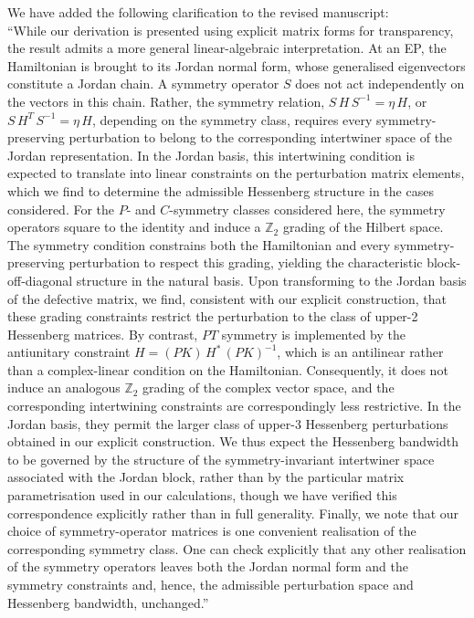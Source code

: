\documentclass[aps,prb,onecolumn,nofootinbib,citeautoscript,10pt]{revtex4-2}
\begin{document}
\begin{enumerate}
We have added the following clarification to the revised manuscript:
\\``While our derivation is presented using explicit matrix forms for transparency, the result admits a more general linear-algebraic interpretation. At an EP, the Hamiltonian is brought to its Jordan normal form, whose generalised eigenvectors constitute a Jordan chain. A symmetry operator $S$ does not act independently on the vectors in this chain. Rather, the symmetry relation, $S \,H\, S^{-1}=\eta \,H$, or $S\, H^{T}\, S^{-1}=\eta \,H$, depending on the symmetry class, requires every symmetry-preserving perturbation to belong to the corresponding intertwiner space of the Jordan representation. In the Jordan basis, this intertwining condition is expected to translate into linear constraints on the perturbation matrix elements, which we find to determine the admissible Hessenberg structure in the cases considered. For the $P$- and $C$-symmetry classes considered here, the symmetry operators square to the identity and induce a $\mathbb{Z}_2$ grading of the Hilbert space. The symmetry condition constrains both the Hamiltonian and every symmetry-preserving perturbation to respect this grading, yielding the characteristic block-off-diagonal structure in the natural basis. Upon transforming to the Jordan basis of the defective matrix, we find, consistent with our explicit construction, that these grading constraints restrict the perturbation to the class of upper-2 Hessenberg matrices.
By contrast, $PT$ symmetry is implemented by the antiunitary constraint $H=(PK)\,H^{*}\,(PK)^{-1}$, which is an antilinear rather than a complex-linear condition on the Hamiltonian. Consequently, it does not induce an analogous $\mathbb{Z}_2$ grading of the complex vector space, and the corresponding intertwining constraints are correspondingly less restrictive. In the Jordan basis, they permit the larger class of upper-3 Hessenberg perturbations obtained in our explicit construction. We thus expect the Hessenberg bandwidth to be governed by the structure of the symmetry-invariant intertwiner space associated with the Jordan block, rather than by the particular matrix parametrisation used in our calculations, though we have verified this correspondence explicitly rather than in full generality.
Finally, we note that our choice of symmetry-operator matrices is one convenient realisation of the corresponding symmetry class. One can check explicitly that any other realisation of the symmetry operators leaves both the Jordan normal form and the symmetry constraints and, hence, the admissible perturbation space and Hessenberg bandwidth, unchanged.''


\end{enumerate}
\end{document}

